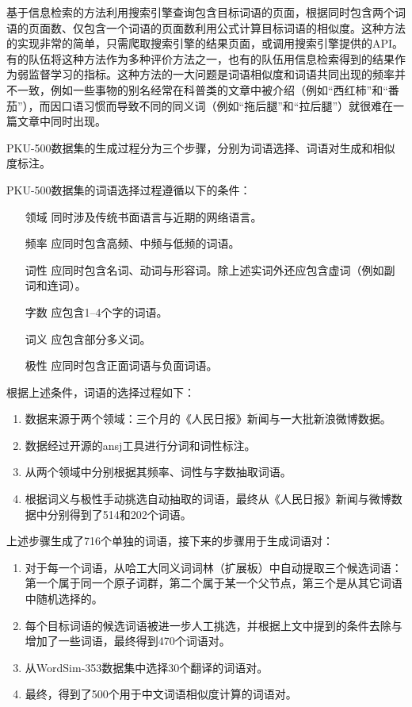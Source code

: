 基于信息检索的方法利用搜索引擎查询包含目标词语的页面，根据同时包含两个词语的页面数、仅包含一个词语的页面数利用公式计算目标词语的相似度。这种方法的实现非常的简单，只需爬取搜索引擎的结果页面，或调用搜索引擎提供的API。有的队伍将这种方法作为多种评价方法之一，也有的队伍用信息检索得到的结果作为弱监督学习的指标。这种方法的一大问题是词语相似度和词语共同出现的频率并不一致，例如一些事物的别名经常在科普类的文章中被介绍（例如“西红柿”和“番茄”），而因口语习惯而导致不同的同义词（例如“拖后腿”和“拉后腿”）就很难在一篇文章中同时出现。

PKU-500数据集的生成过程分为三个步骤，分别为词语选择、词语对生成和相似度标注。

PKU-500数据集的词语选择过程遵循以下的条件：
\begin{itemize}
	\item[领域] 同时涉及传统书面语言与近期的网络语言。
	\item[频率] 应同时包含高频、中频与低频的词语。
	\item[词性] 应同时包含名词、动词与形容词。除上述实词外还应包含虚词（例如副词和连词）。
	\item[字数] 应包含1--4个字的词语。
	\item[词义] 应包含部分多义词。
	\item[极性] 应同时包含正面词语与负面词语。
\end{itemize}
根据上述条件，词语的选择过程如下：
\begin{enumerate}
	\item 数据来源于两个领域：三个月的《人民日报》新闻与一大批新浪微博数据。
	\item 数据经过开源的ansj工具进行分词和词性标注。
	\item 从两个领域中分别根据其频率、词性与字数抽取词语。
	\item 根据词义与极性手动挑选自动抽取的词语，最终从《人民日报》新闻与微博数据中分别得到了514和202个词语。
\end{enumerate}

上述步骤生成了716个单独的词语，接下来的步骤用于生成词语对：
\begin{enumerate}
	\item 对于每一个词语，从哈工大同义词词林（扩展板）中自动提取三个候选词语：第一个属于同一个原子词群，第二个属于某一个父节点，第三个是从其它词语中随机选择的。
	\item 每个目标词语的候选词语被进一步人工挑选，并根据上文中提到的条件去除与增加了一些词语，最终得到470个词语对。
	\item 从WordSim-353数据集中选择30个翻译的词语对。
	\item 最终，得到了500个用于中文词语相似度计算的词语对。
\end{enumerate}

